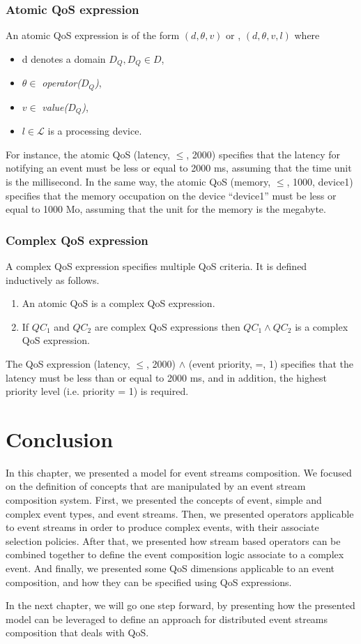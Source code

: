 \subsubsection{Atomic QoS expression} 
An atomic QoS expression is of the form $(d, \theta, v)$ or , $(d, \theta, v, l)$ where 
\begin{itemize}
 \item d denotes a domain $D_Q , D_Q \in D$,
 \item $\theta \in$ \textit{operator($D_Q$)},
 \item $v \in$ \textit{value($D_Q$)},
 \item $l \in \mathcal{L}$ is a processing device.
\end{itemize}
For instance, the atomic QoS (latency, $\leq$, 2000) specifies that the latency for notifying an event must be less or equal to 2000 ms, assuming that the time unit is the millisecond. In the same way, the atomic QoS (memory, $\leq$, 1000, device1) specifies that the memory occupation on the device ``device1'' must be less or equal to 1000 Mo, assuming that the unit for the memory is the megabyte.  

\subsubsection{Complex QoS expression} 
A complex QoS expression specifies multiple QoS criteria. It is defined inductively as follows.
\begin{enumerate}
 \item An atomic QoS is a complex QoS expression.
 \item If $QC_1$ and $QC_2$ are complex QoS expressions then $QC_1 \wedge QC_2$ is a complex QoS expression.
\end{enumerate}
 The QoS expression (latency, $\leq$, 2000) $\wedge$ (event priority, =, 1) specifies that the latency must be less than or equal to 2000 ms, and in addition, the highest priority level (i.e. priority = 1) is required.

 \section{Conclusion}
In this chapter, we presented a model for event streams composition. We focused on the definition of concepts that are manipulated by an event stream composition system. First, we presented the concepts of event, simple and complex event types, and event streams. Then, we presented operators applicable to event streams in order to produce complex events, with their associate selection policies. After that, we presented how stream based operators can be combined together to define the event composition logic associate to a complex event. And finally, we presented some QoS dimensions applicable to an event composition, and how they can be specified using QoS expressions. 

In the next chapter, we will go one step forward, by presenting how the presented model can be leveraged to define an approach for distributed event streams composition that deals with QoS.